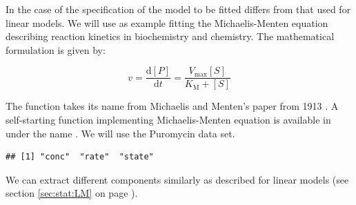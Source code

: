 \documentclass[krantz2]{krantz}\usepackage{knitr}%
\begin{document}
In the case of  the specification of the model to be fitted differs from that used for linear models. We will use as example fitting the Michaelis-Menten equation describing reaction kinetics in biochemistry and chemistry. The mathematical formulation is given by:

\begin{equation}\label{eq:michaelis:menten}
v = \frac{\mathrm{d} [P]}{\mathrm{d} t} = \frac{V_{\mathrm{max}} [S]}{K_{\mathrm{M}} + [S]}
\end{equation}

The function takes its name from Michaelis and Menten's paper from 1913 \autocite{Johnson2011}. A self-starting function implementing Michaelis-Menten equation is available in \Rlang under the name . We will use the Puromycin data set.

\begin{knitrout}\footnotesize
{}\color{fgcolor}\begin{kframe}
\begin{alltt}
\end{alltt}
\begin{verbatim}
## [1] "conc"  "rate"  "state"
\end{verbatim}
\end{kframe}
\end{knitrout}

\begin{knitrout}\footnotesize
{}\color{fgcolor}\begin{kframe}
\begin{alltt}
 \hlkwb{<-}  \hlopt{~}   
              \hlopt{==} \hlstd{)}
\end{alltt}
\end{kframe}
\end{knitrout}

We can extract different components similarly as described for linear models (see section \ref{sec:stat:LM} on page \pageref{sec:stat:LM}).
\end{document}
